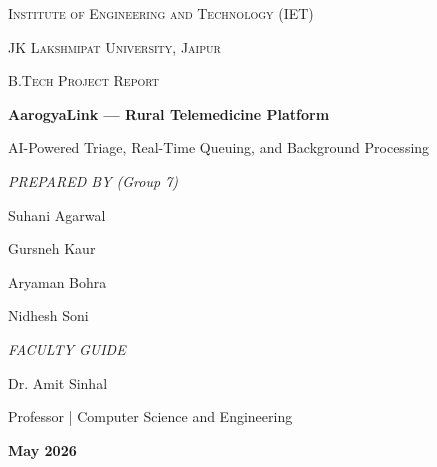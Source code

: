 \documentclass[12pt, a4paper]{article}
\begin{document}
\begin{titlepage}
    \centering
    \vspace*{1cm}
    
    
    {\scshape\LARGE Institute of Engineering and Technology (IET) \par}
    \vspace{0.3cm}
    {\scshape\Large JK Lakshmipat University, Jaipur \par}
    \vspace{2cm}
    {\scshape\Large B.Tech Project Report \par}
    \vspace{1.5cm}
    {\huge\bfseries AarogyaLink --- Rural Telemedicine Platform \par}
    \vspace{0.5cm}
    {\large AI-Powered Triage, Real-Time Queuing, and Background Processing \par}
    
    \vspace{2.5cm}
    {\Large\itshape PREPARED BY (Group 7) \par}
    \vspace{0.5cm}
    {\Large Suhani Agarwal \par}
    {\Large Gursneh Kaur \par}
    {\Large Aryaman Bohra \par}
    {\Large Nidhesh Soni \par}
    
    \vspace{2.5cm}
    {\Large\itshape FACULTY GUIDE \par}
    \vspace{0.5cm}
    {\Large Dr. Amit Sinhal \par}
    {\large Professor | Computer Science and Engineering \par}
    
    \vfill
    {\large \textbf{May 2026} \par}
\end{titlepage}

\tableofcontents
\newpage
\end{document}
